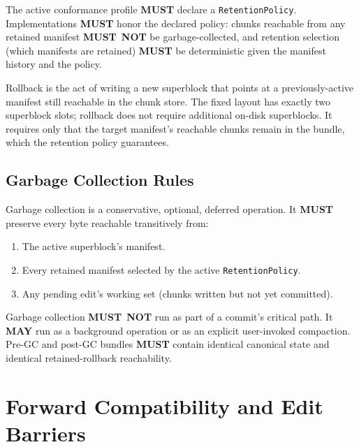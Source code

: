 \documentclass[11pt,letterpaper]{report}
\newcounter{requirement}[chapter]
\newcommand{\MUST}{\textbf{MUST}}
\newcommand{\MUSTNOT}{\textbf{MUST}\nobreak\ \textbf{NOT}}
\newcommand{\MAY}{\textbf{MAY}}
\begin{document}
\begin{requirement}
  \label{req:format:manifest-retention}
  The active conformance profile \MUST{} declare a
  \texttt{RetentionPolicy}. Implementations \MUST{} honor the
  declared policy: chunks reachable from any retained manifest
  \MUSTNOT{} be garbage-collected, and retention selection
  (which manifests are retained) \MUST{} be deterministic given
  the manifest history and the policy.

  Rollback is the act of writing a new superblock that points at
  a previously-active manifest still reachable in the chunk
  store. The fixed layout has exactly two superblock slots;
  rollback does not require additional on-disk superblocks. It
  requires only that the target manifest's reachable chunks
  remain in the bundle, which the retention policy guarantees.
\end{requirement}

\subsection{Garbage Collection Rules}

\begin{requirement}
  \label{req:format:conservative-garbage-collection}
  Garbage collection is a conservative, optional, deferred
  operation. It \MUST{} preserve every byte reachable transitively
  from:

  \begin{enumerate}
    \item The active superblock's manifest.
    \item Every retained manifest selected by the active
      \texttt{RetentionPolicy}.
    \item Any pending edit's working set (chunks written but not
      yet committed).
  \end{enumerate}

  Garbage collection \MUSTNOT{} run as part of a commit's critical
  path. It \MAY{} run as a background operation or as an explicit
  user-invoked compaction. Pre-GC and post-GC bundles \MUST{}
  contain identical canonical state and identical retained-rollback
  reachability.
\end{requirement}

\section{Forward Compatibility and Edit Barriers}
\label{sec:format:fwdcompat}
\end{document}
